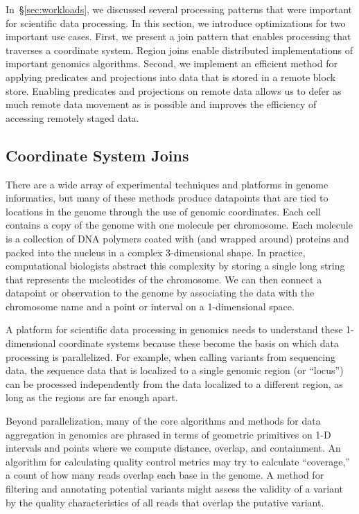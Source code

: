 \documentclass{acm_proc_article-sp}
\begin{document}
In~\S\ref{sec:workloads}, we discussed several processing patterns that were important for scientific
data processing. In this section, we introduce optimizations for two important use cases. First, we present
a join pattern that enables processing that traverses a coordinate system. Region joins enable distributed
implementations of important genomics algorithms. Second, we implement an efficient method for
applying predicates and projections into data that is stored in a remote block store. Enabling predicates
and projections on remote data allows us to defer as much remote data movement as is possible and
improves the efficiency of accessing remotely staged data.

\subsection{Coordinate System Joins}
\label{sec:coordinate-system-joins}

There are a wide array of experimental techniques and platforms in genome informatics, but many of these
methods produce datapoints that are tied to locations in the genome through the use of genomic coordinates.
Each cell contains a copy of the genome with one molecule per chromosome. Each molecule is a collection of
DNA polymers coated with (and wrapped around) proteins and packed into the nucleus in a complex
3-dimensional shape. In practice, computational biologists abstract this complexity by storing a single long
string that represents the nucleotides of the chromosome. We can then connect a datapoint or observation to the
genome by associating the data with the chromosome name and a point or interval on a 1-dimensional space.

A platform for scientific data processing in genomics needs to understand these 1-dimensional coordinate
systems because these become the basis on which data processing is parallelized. For example, when calling
variants from sequencing data, the sequence data that is localized to a single genomic region (or ``locus'') can be 
processed independently from the data localized to a different region, as long as the regions are far enough
apart.

Beyond parallelization, many of the core algorithms and methods for data aggregation in genomics are phrased
in terms of geometric primitives on 1-D intervals and points where we compute distance, overlap, and
containment.  An algorithm for calculating quality control metrics may try to calculate ``coverage,'' a count
of how many reads overlap each base in the genome. A method for filtering and annotating potential variants
might assess the validity of a variant by the quality characteristics of all reads that overlap the putative variant.
\end{document}
